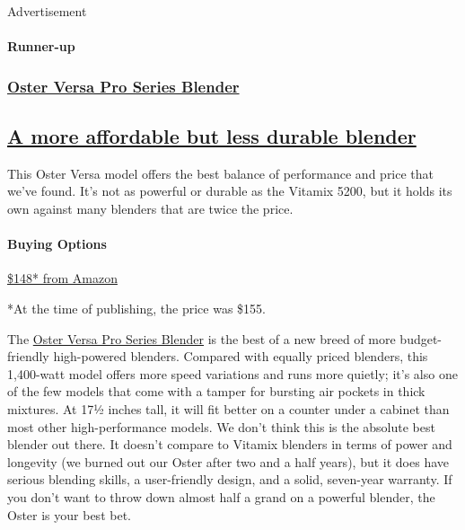 Advertisement

\hypertarget{runner-up}{%
\paragraph{Runner-up}\label{runner-up}}

\href{https://www.nytimes3xbfgragh.onion/wirecutter/out/link/3754/162049/4/109195?merchant=Amazon}{}

\hypertarget{oster-versa-pro-series-blender}{%
\subsubsection{\texorpdfstring{\href{https://www.nytimes3xbfgragh.onion/wirecutter/out/link/3754/162049/4/109195?merchant=Amazon}{Oster
Versa Pro Series
Blender}}{Oster Versa Pro Series Blender}}\label{oster-versa-pro-series-blender}}

\hypertarget{a-more-affordable-but-less-durable-blender}{%
\subsection{\texorpdfstring{\href{https://www.nytimes3xbfgragh.onion/wirecutter/out/link/3754/162049/4/109195?merchant=Amazon}{A
more affordable but less durable
blender}}{A more affordable but less durable blender}}\label{a-more-affordable-but-less-durable-blender}}

This Oster Versa model offers the best balance of performance and price
that we've found. It's not as powerful or durable as the Vitamix 5200,
but it holds its own against many blenders that are twice the price.

\hypertarget{buying-options-1}{%
\paragraph{Buying Options}\label{buying-options-1}}

\href{https://www.nytimes3xbfgragh.onion/wirecutter/out/link/3754/162049/4/109195?merchant=Amazon}{\$148*
from Amazon}

*At the time of publishing, the price was \$155.

The
\href{https://www.nytimes3xbfgragh.onion/wirecutter/out/link/3754/162049/4/69780/?merchant=Amazon}{Oster
Versa Pro Series Blender} is the best of a new breed of more
budget-friendly high-powered blenders. Compared with equally priced
blenders, this 1,400-watt model offers more speed variations and runs
more quietly; it's also one of the few models that come with a tamper
for bursting air pockets in thick mixtures. At 17½ inches tall, it will
fit better on a counter under a cabinet than most other high-performance
models. We don't think this is the absolute best blender out there. It
doesn't compare to Vitamix blenders in terms of power and longevity (we
burned out our Oster after two and a half years), but it does have
serious blending skills, a user-friendly design, and a solid, seven-year
warranty. If you don't want to throw down almost half a grand on a
powerful blender, the Oster is your best bet.

